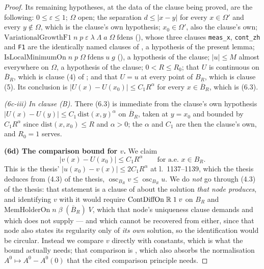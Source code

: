 \begin{proof}
Its remaining hypotheses, at the data of the clause being proved, are the
following: $0\le\varepsilon\le1$; $\Omega$ open; the separation
$d\le|x-y|$ for every $x\in\Omega'$ and every $y\notin\Omega$, which is the
clause's own hypothesis; $x_0\in\Omega'$, also the clause's own;
$\mathrm{VariationalGrowthF1}\;n\;p\;\varepsilon\;\lambda\;\Lambda\;a\;
\Omega\;\mathrm{fdens}$ (), whose three clauses
\texttt{meas\_x}, \texttt{cont\_zh} and \texttt{F1} are the identically named
clauses of , a hypothesis of the present
lemma; $\mathrm{IsLocalMinimumOn}\;n\;p\;\Omega\;\mathrm{fdens}\;u\;g$
(), a hypothesis of the clause; $|u|\le M$ almost
everywhere on $\Omega$, a hypothesis of the clause; $0<R\le R_0$; that $U$ is
continuous on $\overline B_R$, which is clause (4) of
; and that $U=u$ at every point of $B_R$, which is
clause (5).  Its conclusion is
$|U(x)-U(x_0)|\le C_1R^{\alpha}$ for every $x\in\overline B_R$, which is
(6.3).

\emph{(6c-iii) In clause \textup{(B)}.}  There (6.3) is immediate from the
clause's own hypothesis $|U(x)-U(y)|\le C_1\,\mathrm{dist}(x,y)^{\alpha}$ on
$\overline B_R$, taken at $y=x_0$ and bounded by $C_1R^{\alpha}$ since
$\mathrm{dist}(x,x_0)\le R$ and $\alpha>0$; the $\alpha$ and $C_1$ are then the
clause's own, and $R_0=1$ serves.

\textbf{(6d) The comparison bound for $v$.}  We claim
\[
|v(x)-U(x_0)|\le C_1R^{\alpha}\qquad\text{for a.e.\ }x\in B_R .
\tag{6.4}
\]
This is the thesis' $|u(x_0)-v(x)|\le2C_1R^{\alpha}$ at l.~1137--1139, which the
thesis deduces from (4.3) of the thesis, $\operatorname*{osc}_{B_R}v\le
\operatorname*{osc}_{B_R}u$.  We do \emph{not} go through (4.3) of the thesis: that
statement is a clause of  about the solution
\emph{that node produces}, and identifying $v$ with it would require
$\mathrm{ContDiffOn}\;\mathbb{R}\;1\;v$ on $B_R$ and
$\mathrm{MemHolderOn}\;n\;\beta\;(\overline B_R)\;V$, which that node's
uniqueness clause demands and which  does not
supply --- and which cannot be recovered from
 either, since that node also states its
regularity only of \emph{its own} solution, so the identification would be
circular.  Instead we compare $v$ directly with constants, which is what the
bound actually needs; that comparison is ,
which also absorbs the normalisation $A^0\mapsto A^0-A^0(0)$ that the cited
comparison principle needs.


\end{proof}
